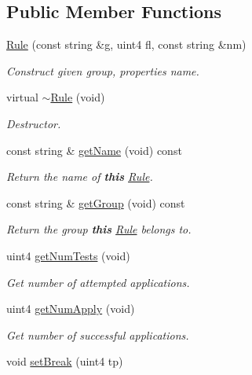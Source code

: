 \subsection*{Public Member Functions}
\begin{DoxyCompactItemize}
\item 
\mbox{\hyperlink{class_rule_af34899104f25035253a67d4d2665d0bf}{Rule}} (const string \&g, uint4 fl, const string \&nm)
\begin{DoxyCompactList}\small\item\em Construct given group, properties name. \end{DoxyCompactList}\item 
virtual \mbox{\hyperlink{class_rule_a7c2f3b6250b44b405910247fa4d8af2f}{$\sim$\+Rule}} (void)
\begin{DoxyCompactList}\small\item\em Destructor. \end{DoxyCompactList}\item 
const string \& \mbox{\hyperlink{class_rule_a6f9d905bc475179232607bf69a6ca8c2}{get\+Name}} (void) const
\begin{DoxyCompactList}\small\item\em Return the name of {\bfseries{this}} \mbox{\hyperlink{class_rule}{Rule}}. \end{DoxyCompactList}\item 
const string \& \mbox{\hyperlink{class_rule_a2192026b8e90d56922a150e099783cd5}{get\+Group}} (void) const
\begin{DoxyCompactList}\small\item\em Return the group {\bfseries{this}} \mbox{\hyperlink{class_rule}{Rule}} belongs to. \end{DoxyCompactList}\item 
uint4 \mbox{\hyperlink{class_rule_a09a1d644210724868a0ad460dace9950}{get\+Num\+Tests}} (void)
\begin{DoxyCompactList}\small\item\em Get number of attempted applications. \end{DoxyCompactList}\item 
uint4 \mbox{\hyperlink{class_rule_a082c3f756c47649c375df160c4260992}{get\+Num\+Apply}} (void)
\begin{DoxyCompactList}\small\item\em Get number of successful applications. \end{DoxyCompactList}\item 
void \mbox{\hyperlink{class_rule_a4cce5ac5ef68009ddaebc058852c5d7d}{set\+Break}} (uint4 tp)

\end{DoxyCompactItemize}
